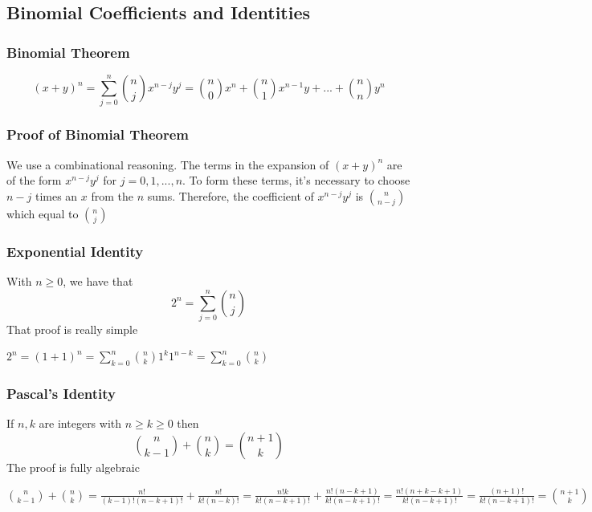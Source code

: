 \documentclass{article}
\begin{document}
\subsection{Binomial Coefficients and Identities}
\subsubsection{Binomial Theorem}
\begin{tcolorbox}[sharp corners, colback=green!30, colframe=green!80!blue, title=Binomial Theorem]
\begin{equation}
(x+y)^n = \sum_{j=0}^n \binom{n}{j}x^{n-j}y^{j} = \binom{n}{0}x^n + \binom{n}{1}x^{n-1}y + ... + \binom{n}{n}y^n
\end{equation}
\end{tcolorbox}

\subsubsection{Proof of Binomial Theorem}
\begin{tcolorbox}
We use a combinational reasoning. The terms in the expansion of $ (x+y)^n $ are of the form $ x^{n-j}y^j $ for $ j = 0,1,...,n $. To form these terms, it's necessary to choose $ n - j $ times an $ x $ from the $ n $ sums. Therefore, the coefficient of $ x^{n-j}y^j $ is $ \binom{n}{n-j} $ which equal to $ \binom{n}{j} $
\end{tcolorbox}

\subsubsection{Exponential Identity} With $ n \geq 0 $, we have that
\begin{equation}
2^n = \sum_{j=0}^n \binom{n}{j}
\end{equation}
That proof is really simple
\begin{tcolorbox}
$ 2^n = (1 + 1)^n = \sum_{k=0}^n \binom{n}{k}1^k1^{n-k} = \sum_{k=0}^n \binom{n}{k} $
\end{tcolorbox}

\subsubsection{Pascal's Identity} If $ n,k $ are integers with $ n \geq k \geq 0 $ then
\begin{equation}
\binom{n}{k-1} + \binom{n}{k} = \binom{n+1}{k}
\end{equation}
The proof is fully algebraic
\begin{tcolorbox}
$ \binom{n}{k-1} + \binom{n}{k} = \frac{n!}{(k-1)!(n-k+1)!} + \frac{n!}{k!(n-k)!} = \frac{n!k}{k!(n-k+1)!} + \frac{n!(n-k+1)}{k!(n-k+1)!} = \frac{n!(n+k-k+1)}{k!(n-k+1)!} = \frac{(n+1)!}{k!(n-k+1)!} = \binom{n+1}{k} $
\end{tcolorbox}
\end{document}
